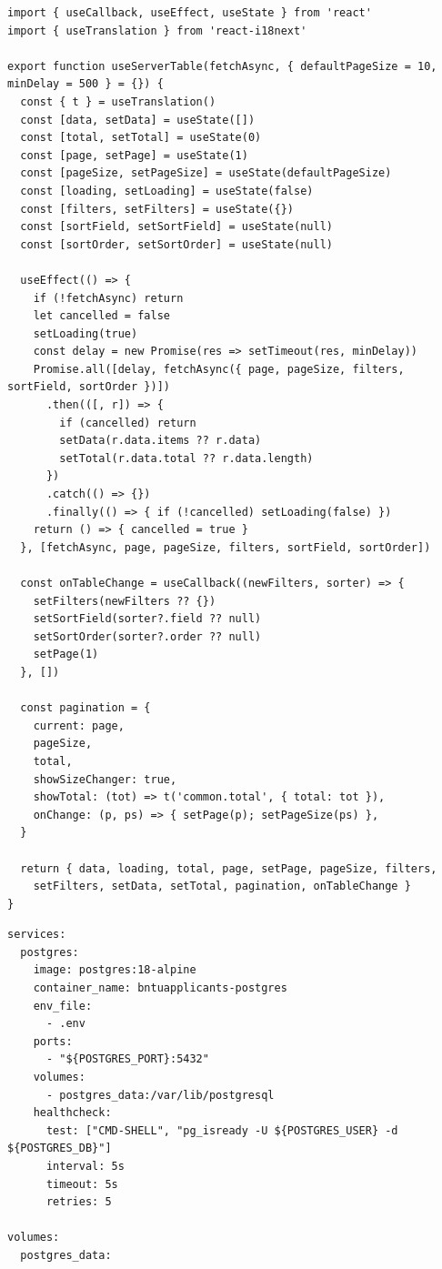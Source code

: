 \begin{lstlisting}[style=jsxstyle]
import { useCallback, useEffect, useState } from 'react'
import { useTranslation } from 'react-i18next'

export function useServerTable(fetchAsync, { defaultPageSize = 10, minDelay = 500 } = {}) {
  const { t } = useTranslation()
  const [data, setData] = useState([])
  const [total, setTotal] = useState(0)
  const [page, setPage] = useState(1)
  const [pageSize, setPageSize] = useState(defaultPageSize)
  const [loading, setLoading] = useState(false)
  const [filters, setFilters] = useState({})
  const [sortField, setSortField] = useState(null)
  const [sortOrder, setSortOrder] = useState(null)

  useEffect(() => {
    if (!fetchAsync) return
    let cancelled = false
    setLoading(true)
    const delay = new Promise(res => setTimeout(res, minDelay))
    Promise.all([delay, fetchAsync({ page, pageSize, filters, sortField, sortOrder })])
      .then(([, r]) => {
        if (cancelled) return
        setData(r.data.items ?? r.data)
        setTotal(r.data.total ?? r.data.length)
      })
      .catch(() => {})
      .finally(() => { if (!cancelled) setLoading(false) })
    return () => { cancelled = true }
  }, [fetchAsync, page, pageSize, filters, sortField, sortOrder])

  const onTableChange = useCallback((newFilters, sorter) => {
    setFilters(newFilters ?? {})
    setSortField(sorter?.field ?? null)
    setSortOrder(sorter?.order ?? null)
    setPage(1)
  }, [])

  const pagination = {
    current: page,
    pageSize,
    total,
    showSizeChanger: true,
    showTotal: (tot) => t('common.total', { total: tot }),
    onChange: (p, ps) => { setPage(p); setPageSize(ps) },
  }

  return { data, loading, total, page, setPage, pageSize, filters,
    setFilters, setData, setTotal, pagination, onTableChange }
}
\end{lstlisting}

\begin{lstlisting}
services:
  postgres:
    image: postgres:18-alpine
    container_name: bntuapplicants-postgres
    env_file:
      - .env
    ports:
      - "${POSTGRES_PORT}:5432"
    volumes:
      - postgres_data:/var/lib/postgresql
    healthcheck:
      test: ["CMD-SHELL", "pg_isready -U ${POSTGRES_USER} -d ${POSTGRES_DB}"]
      interval: 5s
      timeout: 5s
      retries: 5

volumes:
  postgres_data:
\end{lstlisting}

